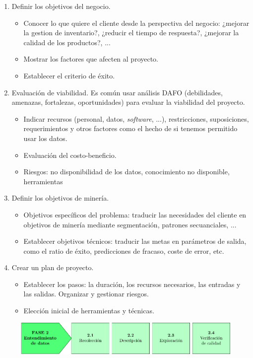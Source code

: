 \begin{enumerate}[label=1.\arabic*]
\item Definir los objetivos del negocio. 
\begin{itemize}
\item Conocer lo que quiere el cliente desde la perspectiva del negocio: ¿mejorar la gestion de inventario?, ¿reducir el tiempo de respuesta?, ¿mejorar la calidad de los productos?, ...
\item Mostrar los factores que afecten al proyecto.
\item Establecer el criterio de éxito.
\end{itemize}
\item Evaluación de viabilidad. Es común usar análisis DAFO (debilidades, amenazas, fortalezas, oportunidades) para evaluar la viabilidad del proyecto.
\begin{itemize}
\item Indicar recursos (personal, datos, \textit{software}, ...), restricciones, suposiciones, requerimientos y otros factores como el hecho de si tenemos permitido usar los datos.
\item Evaluación del costo-beneficio.
\item Riesgos: no disponibilidad de los datos, conocimiento no disponible, herramientas
\end{itemize}
\item Definir los objetivos de minería.
\begin{itemize}
\item Objetivos específicos del problema: traducir las necesidades del cliente en objetivos de minería mediante segmentación, patrones secuanciales, ... 
\item Establecer objetivos técnicos: traducir las metas en parámetros de salida, como el ratio de éxito, predicciones de fracaso, coste de error, etc.
\end{itemize}
\item Crear un plan de proyecto.
\begin{itemize}
\item Establecer los pasos: la duración, los recursos necesarios, las entradas y las salidas. Organizar y gestionar riesgos. 
\item Elección inicial de herramientas y técnicas.
\end{itemize}
\end{enumerate}

\begin{figure}[H]
\centering
\includegraphics[width=\textwidth]{fotos/14.pdf}
\end{figure}

